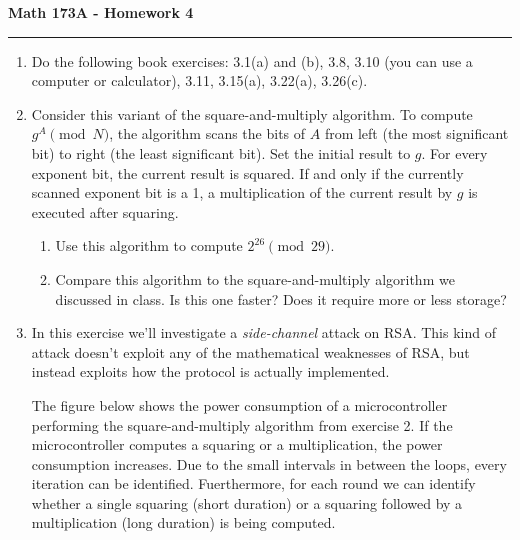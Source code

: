 \documentclass[11pt,letterpaper]{article}
\begin{document}
\begin{center}
{\bf \Large Math 173A - Homework 4}
\vspace{0.2cm}
\hrule
\end{center}



\begin{enumerate}

\item Do the following book exercises: 3.1(a) and (b), 3.8, 3.10 (you can use a computer or calculator), 3.11, 3.15(a), 3.22(a), 3.26(c).


\item Consider this variant of the square-and-multiply algorithm.
To compute $g^A\pmod N$, the algorithm scans the bits of $A$ from left (the most significant bit) to right (the least significant bit).
Set the initial result to $g$.
For every exponent bit, the current result is squared.
If and only if the currently scanned exponent bit is a 1, a multiplication of the current result by $g$ is executed after squaring.

\begin{enumerate}
    \item Use this algorithm to compute $2^{26}\pmod {29}$.

    \item Compare this algorithm to the square-and-multiply algorithm we discussed in class.
    Is this one faster?
    Does it require more or less storage?
\end{enumerate}



\item In this exercise we'll investigate a \emph{side-channel} attack on RSA.
This kind of attack doesn't exploit any of the mathematical weaknesses of RSA, but instead exploits how the protocol is actually implemented.

The figure below shows the power consumption of a microcontroller performing the square-and-multiply algorithm from exercise 2.
If the microcontroller computes a squaring or a multiplication, the power consumption increases.
Due to the small intervals in between the loops, every iteration can be identified.
Fuerthermore, for each round we can identify whether a single squaring (short duration) or a squaring followed by a multiplication (long duration) is being computed.


\end{enumerate}
\end{document}
